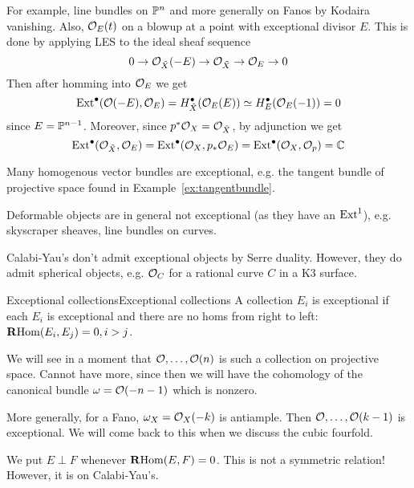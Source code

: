 For example, line bundles on $\P^n$ and more generally on Fanos by Kodaira vanishing. Also, $\O_{E}(t)$ on a blowup at a point with exceptional divisor $E$. This is done by applying LES to the ideal sheaf sequence
\begin{equation*}
    0 \to \O_{\tilde X}(-E) \to \O_{\tilde X} \to \O_E \to 0
\end{equation*}
Then after homming into $\O_E$ we get
\begin{equation*}
    \Ext^\bullet(\O(-E),\O_E)
        = H^\bullet_{\tilde X}(\O_E(E))
        \simeq H^\bullet_E(\O_E(-1))=0
\end{equation*}
since $E=\P^{n-1}$. Moreover, since $p^*\O_X=\O_{\tilde X}$, by adjunction we get
\begin{equation*}
    \Ext^\bullet(\O_{\tilde X},\O_E)
        = \Ext^\bullet(\O_X,p_*\O_E)
        = \Ext^\bullet(\O_X,\O_p)
        = \C
\end{equation*}

Many homogenous vector bundles are exceptional, e.g. the tangent bundle of projective space found in
Example~\ref{ex:tangentbundle}.

Deformable objects are in general not exceptional (as they have an $\Ext^1$), e.g. skyscraper sheaves, line bundles on curves. 

\begin{remark}{}{}
    Calabi-Yau's don't admit exceptional objects by Serre duality. However, they do admit spherical objects, e.g. $\O_C$ for a rational curve $C$ in a K3 surface.
\end{remark}

\begin{definition}{Exceptional collections}{Exceptional collections}
    A collection $E_i$ is exceptional if each $E_i$ is exceptional and there are no homs from right to left: $\RHom(E_i,E_j)=0, i>j$.
\end{definition}

We will see in a moment that $\O,\dots,\O(n)$ is such a collection on projective space. Cannot have more, since then we will have the cohomology of the canonical bundle $\omega=\O(-n-1)$ which is nonzero.

More generally, for a Fano, $\omega_X=\O_X(-k)$ is antiample. Then $\O,\dots,\O(k-1)$ is exceptional. We will come back to this when we discuss the cubic fourfold.

We put $E \perp F$ whenever $\RHom(E,F)=0$. This is not a symmetric relation! However, it is on Calabi-Yau's.

